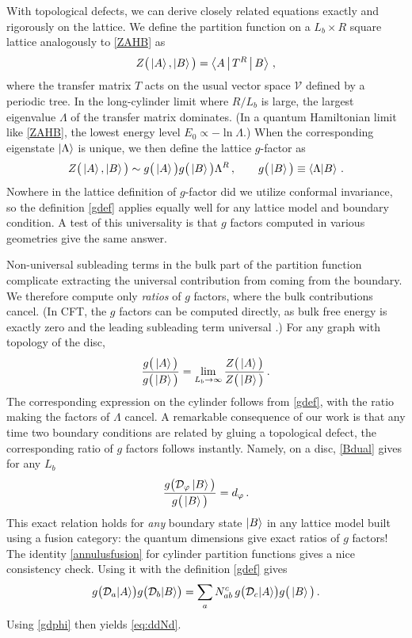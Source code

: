 With topological defects, we can derive closely related equations exactly and rigorously on the lattice. We define the partition function on a $L_b\times R$ square lattice analogously to \eqref{ZAHB} as
\begin{align} 
	Z\big(\ket{A},\ket{B}\big) = \Braket{A | T^{R} | B }\,,
\end{align} 
where the transfer matrix $T$ acts on the usual vector space $\mathcal{V}$ defined by a periodic tree. In the long-cylinder limit where $R/L_b$ is large, the largest eigenvalue $\Lambda$ of the transfer matrix dominates. (In a quantum Hamiltonian limit like \eqref{ZAHB}, the lowest energy level $E_0\propto -\ln \Lambda$.)  When the corresponding eigenstate $\ket{\Lambda}$ is unique, we then define the lattice $g$-factor as
\begin{align}
Z\big(\ket{A},\ket{B}\big)  \sim g\big(\ket{A}\big)g\big(\ket{B}\big) \Lambda^R \,,\qquad g\big(\ket{B}\big)\equiv \braket{\Lambda| B}\,.
\label{gdef}
\end{align}
Nowhere in the lattice definition of $g$-factor did we utilize conformal invariance, so the definition \eqref{gdef} applies equally well for any lattice model and boundary condition. A test of this universality is that $g$ factors computed in various geometries give the same answer. 


Non-universal subleading terms in the bulk part of the partition function complicate extracting the universal contribution from coming from the boundary. We therefore compute only {\em ratios} of $g$ factors, where the bulk contributions cancel. (In CFT, the $g$ factors can be computed directly, as bulk free energy is exactly zero and the leading subleading term universal \cite{Blote1986,Affleck1986}.) For any graph with topology of the disc,
\begin{align}
\frac{g\big(\ket{A}\big)}{g\big(\ket{B}\big)} = \lim_{L_b\to\infty}\frac{Z\big(\ket{A}\big)}{Z\big(\ket{B}\big)} \,.
\label{gratiodef}
\end{align}
The corresponding expression on the cylinder follows from \eqref{gdef}, with the ratio making the factors of $\Lambda$ cancel. A remarkable consequence of our work is that any time two boundary conditions are related by gluing a topological defect, the corresponding ratio of $g$ factors follows instantly. Namely, on a disc, \eqref{Bdual} gives for any $L_b$
\begin{align}
\frac{g\big(\mathcal{D}_\varphi \ket{B}\big)}{g\big(\ket{B}\big)} = d_\varphi \,.
\label{gdphi}
\end{align}
This exact relation holds for {\em any} boundary state $\ket{B}$ in any lattice model built using a fusion category: the quantum dimensions give exact ratios of $g$ factors!
The identity \eqref{annulusfusion} for cylinder partition functions gives a nice consistency check. Using it with the definition \eqref{gdef} gives
\begin{align}
g\big(\mathcal{D}_a|A\rangle\big)g\big(\mathcal{D}_b|B\rangle\big)=\sum_a N_{ab}^c\, g\big(\mathcal{D}_c |A\rangle\big) g\big(\ket{B}\big) \,.
\end{align}
Using \eqref{gdphi} then yields \eqref{eq:ddNd}.


